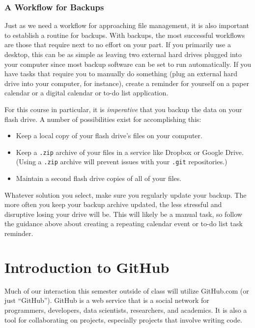 \documentclass[]{book}
\providecommand{\tightlist}{%
  \setlength{\itemsep}{0pt}\setlength{\parskip}{0pt}}
\begin{document}
\subsection{A Workflow for Backups}\label{a-workflow-for-backups}

Just as we need a workflow for approaching file management, it is also
important to establish a routine for backups. With backups, the most
successful workflows are those that require next to no effort on your
part. If you primarily use a desktop, this can be as simple as leaving
two external hard drives plugged into your computer since most backup
software can be set to run automatically. If you have tasks that require
you to manually do something (plug an external hard drive into your
computer, for instance), create a reminder for yourself on a paper
calendar or a digital calendar or to-do list application.

For this course in particular, it is \emph{imperative} that you backup
the data on your flash drive. A number of possibilities exist for
accomplishing this:

\begin{itemize}
\tightlist
\item
  Keep a local copy of your flash drive's files on your computer.
\item
  Keep a \texttt{.zip} archive of your files in a service like Dropbox
  or Google Drive. (Using a \texttt{.zip} archive will prevent issues
  with your \texttt{.git} repositories.)
\item
  Maintain a second flash drive copies of all of your files.
\end{itemize}

Whatever solution you select, make sure you regularly update your
backup. The more often you keep your backup archive updated, the less
stressful and disruptive losing your drive will be. This will likely be
a manual task, so follow the guidance above about creating a repeating
calendar event or to-do list task reminder.

\chapter{Introduction to GitHub}\label{introduction-to-github}

Much of our interaction this semester outside of class will utilize
GitHub.com (or just ``GitHub''). GitHub is a web service that is a
social network for programmers, developers, data scientists,
researchers, and academics. It is also a tool for collaborating on
projects, especially projects that involve writing code.
\end{document}
